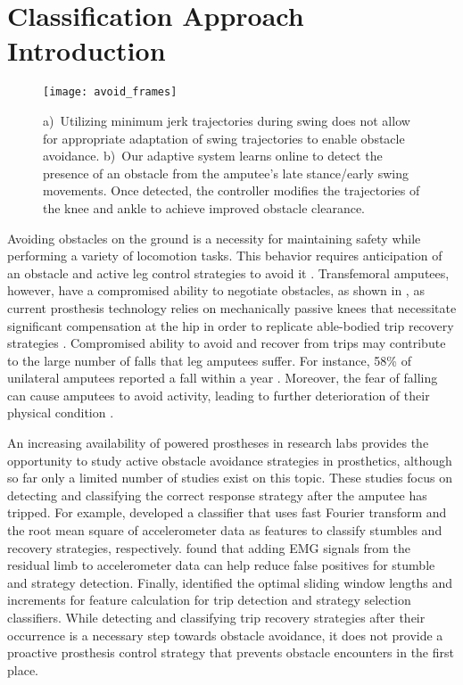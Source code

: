 \section{Classification Approach Introduction}\label{sec:swing_control_class}

\begin{figure*}[t]
\centering
\texttt{[image: avoid\_frames]}
\caption{a)~Utilizing minimum jerk trajectories during swing does not allow for
appropriate adaptation of swing trajectories to enable obstacle avoidance.
b)~Our adaptive system learns online to detect the presence of an obstacle from
the amputee's late stance/early swing movements. Once detected, the controller
modifies the trajectories of the knee and ankle to achieve improved obstacle
clearance.}
\label{fig:avoid_frames}
\end{figure*}

Avoiding obstacles on the ground is a necessity for maintaining safety while
performing a variety of locomotion tasks. This behavior requires anticipation of
an obstacle and active leg control strategies to avoid it \citep{patla1995role}.
Transfemoral amputees, however, have a compromised ability to negotiate
obstacles, as shown in , as current prosthesis technology
relies on mechanically passive knees that necessitate significant compensation
at the hip in order to replicate able-bodied trip recovery strategies
\citep{shirota2015transfemoral}. Compromised ability to avoid and recover from
trips may contribute to the large number of falls that leg amputees suffer. For
instance, 58\% of unilateral amputees reported a fall within a year
\citep{kulkarni1996falls}. Moreover, the fear of falling can cause amputees to
avoid activity, leading to further deterioration of their physical condition
\citep{miller2001prevalence}.

An increasing availability of powered prostheses in research labs provides the
opportunity to study active obstacle avoidance strategies in prosthetics,
although so far only a limited number of studies exist on this topic. These
studies focus on detecting and classifying the correct response strategy after
the amputee has tripped. For example, \citet{lawson2010stumble} developed a
classifier that uses fast Fourier transform and the root mean square of
accelerometer data as features to classify stumbles and recovery strategies,
respectively. \citet{zhang2011towards} found that adding EMG signals from the
residual limb to accelerometer data can help reduce false positives for stumble
and strategy detection. Finally, \citet{shirota2014recovery} identified the
optimal sliding window lengths and increments for feature calculation for trip
detection and strategy selection classifiers. While detecting and classifying
trip recovery strategies after their occurrence is a necessary step towards
obstacle avoidance, it does not provide a proactive prosthesis control strategy
that prevents obstacle encounters in the first place.


